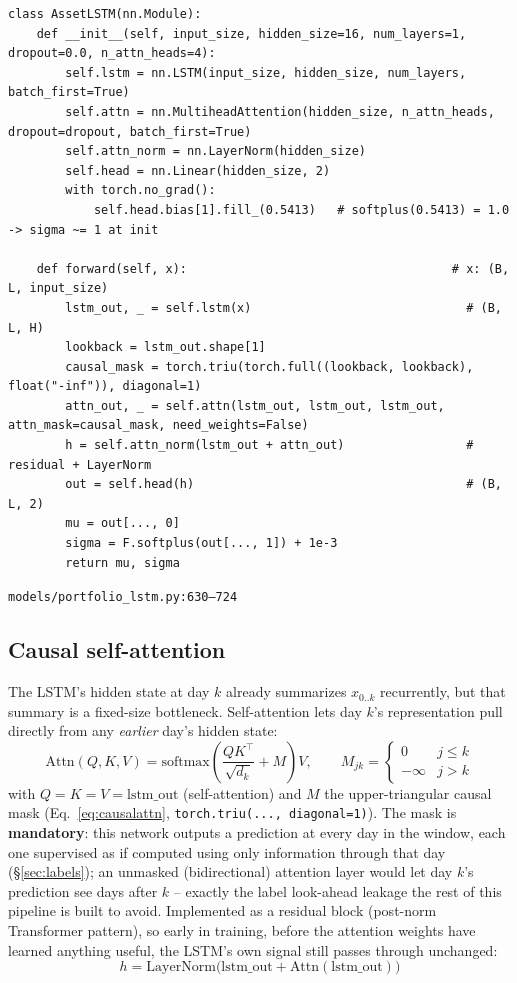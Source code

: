 \documentclass[11pt]{article}
\newcommand{\srcref}[1]{\hfill\textcolor{cmtcolor}{\footnotesize\texttt{#1}}}
\newcommand{\code}[1]{\texttt{\small #1}}
\begin{document}
\begin{lstlisting}[caption={AssetLSTM: LSTM, causal self-attention, heteroscedastic head.}, label=lst:assetlstm]
class AssetLSTM(nn.Module):
    def __init__(self, input_size, hidden_size=16, num_layers=1, dropout=0.0, n_attn_heads=4):
        self.lstm = nn.LSTM(input_size, hidden_size, num_layers, batch_first=True)
        self.attn = nn.MultiheadAttention(hidden_size, n_attn_heads, dropout=dropout, batch_first=True)
        self.attn_norm = nn.LayerNorm(hidden_size)
        self.head = nn.Linear(hidden_size, 2)
        with torch.no_grad():
            self.head.bias[1].fill_(0.5413)   # softplus(0.5413) = 1.0 -> sigma ~= 1 at init

    def forward(self, x):                                     # x: (B, L, input_size)
        lstm_out, _ = self.lstm(x)                              # (B, L, H)
        lookback = lstm_out.shape[1]
        causal_mask = torch.triu(torch.full((lookback, lookback), float("-inf")), diagonal=1)
        attn_out, _ = self.attn(lstm_out, lstm_out, lstm_out, attn_mask=causal_mask, need_weights=False)
        h = self.attn_norm(lstm_out + attn_out)                 # residual + LayerNorm
        out = self.head(h)                                      # (B, L, 2)
        mu = out[..., 0]
        sigma = F.softplus(out[..., 1]) + 1e-3
        return mu, sigma
\end{lstlisting}
\srcref{models/portfolio\_lstm.py:630--724}

\subsection{Causal self-attention}

The LSTM's hidden state at day $k$ already summarizes $x_{0..k}$ recurrently, but that
summary is a fixed-size bottleneck. Self-attention lets day $k$'s representation pull
directly from any \emph{earlier} day's hidden state:
\begin{equation}
  \text{Attn}(Q,K,V) = \mathrm{softmax}\!\left(\frac{QK^\top}{\sqrt{d_k}} + M\right) V, \qquad
  M_{jk} = \begin{cases} 0 & j \le k \\ -\infty & j > k \end{cases}
  \label{eq:causalattn}
\end{equation}
with $Q=K=V=\text{lstm\_out}$ (self-attention) and $M$ the upper-triangular causal mask
(Eq.~\ref{eq:causalattn}, \code{torch.triu(..., diagonal=1)}). The mask is \textbf{mandatory}:
this network outputs a prediction at every day in the window, each one supervised as if
computed using only information through that day (\S\ref{sec:labels}); an unmasked
(bidirectional) attention layer would let day $k$'s prediction see days after $k$ -- exactly
the label look-ahead leakage the rest of this pipeline is built to avoid. Implemented as a
residual block (post-norm Transformer pattern), so early in training, before the attention
weights have learned anything useful, the LSTM's own signal still passes through unchanged:
\begin{equation}
  h = \mathrm{LayerNorm}\big(\text{lstm\_out} + \text{Attn}(\text{lstm\_out})\big)
  \label{eq:residual}
\end{equation}
\end{document}
